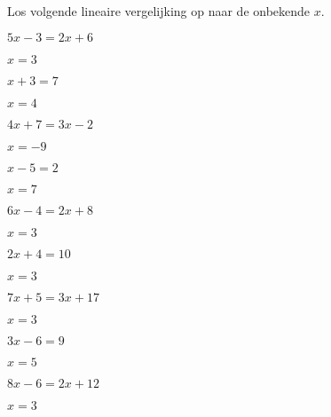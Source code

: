 \documentclass{ximera}
\begin{document}
	\author{Wiskunde Op Maat}

   
\begin{exercise} Los volgende lineaire vergelijking op naar de onbekende \(x\).
  \begin{xmmulticols}

    \begin{question} \( 5x - 3  = 2x + 6   \) \begin{oplossing} \( x = 3   \) \end{oplossing} \end{question}
    \begin{question} \( x + 3   = 7        \) \begin{oplossing} \( x = 4   \) \end{oplossing} \end{question}
    \begin{question} \( 4x + 7  = 3x - 2   \) \begin{oplossing} \( x = -9  \) \end{oplossing} \end{question}
    \begin{question} \( x - 5   = 2        \) \begin{oplossing} \( x = 7   \) \end{oplossing} \end{question}
    \begin{question} \( 6x - 4  = 2x + 8   \) \begin{oplossing} \( x = 3   \) \end{oplossing} \end{question}
    \begin{question} \( 2x + 4  = 10       \) \begin{oplossing} \( x = 3   \) \end{oplossing} \end{question}
    \begin{question} \( 7x + 5  = 3x + 17  \) \begin{oplossing} \( x = 3   \) \end{oplossing} \end{question}
    \begin{question} \( 3x - 6  = 9        \) \begin{oplossing} \( x = 5   \) \end{oplossing} \end{question}
    \begin{question} \( 8x - 6  = 2x + 12  \) \begin{oplossing} \( x = 3   \) \end{oplossing} \end{question}

\end{xmmulticols}
\end{exercise}
\end{document}
